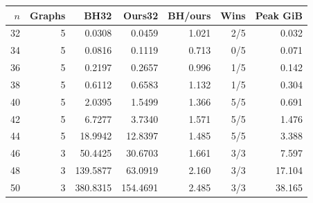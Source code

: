 \begin{tabular}{rrrrrrr}
\toprule
$n$ & Graphs & BH32 & Ours32 & BH/ours & Wins & Peak GiB\\
\midrule
32 & 5 & 0.0308 & 0.0459 & 1.021 & 2/5 & 0.032\\
34 & 5 & 0.0816 & 0.1119 & 0.713 & 0/5 & 0.071\\
36 & 5 & 0.2197 & 0.2657 & 0.996 & 1/5 & 0.142\\
38 & 5 & 0.6112 & 0.6583 & 1.132 & 1/5 & 0.304\\
40 & 5 & 2.0395 & 1.5499 & 1.366 & 5/5 & 0.691\\
42 & 5 & 6.7277 & 3.7340 & 1.571 & 5/5 & 1.476\\
44 & 5 & 18.9942 & 12.8397 & 1.485 & 5/5 & 3.388\\
46 & 3 & 50.4425 & 30.6703 & 1.661 & 3/3 & 7.597\\
48 & 3 & 139.5877 & 63.0919 & 2.160 & 3/3 & 17.104\\
50 & 3 & 380.8315 & 154.4691 & 2.485 & 3/3 & 38.165\\
\bottomrule
\end{tabular}
